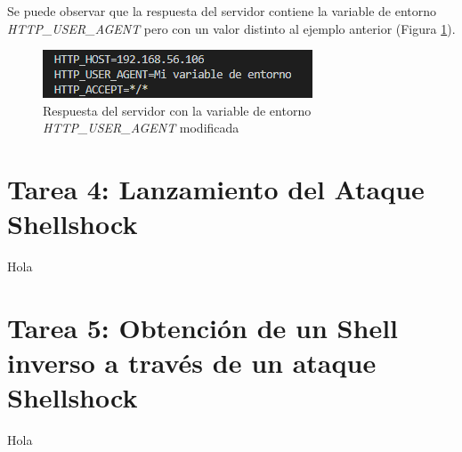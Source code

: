 \documentclass[10pt,a4paper]{article}
\begin{document}
Se puede observar que la respuesta del servidor contiene la variable de entorno \emph{HTTP\_{}USER\_{}AGENT} pero con un valor distinto al ejemplo anterior (Figura \ref{fig:tarea3_modificado}).


\begin{figure}[h!]
\centering
\includegraphics[scale=0.9]{images/Tarea_3_modificada.png}
\caption{Respuesta del servidor con la variable de entorno \emph{HTTP\_{}USER\_{}AGENT} modificada}
\label{fig:tarea3_modificado} 
\end{figure}

\section{Tarea 4: Lanzamiento del Ataque Shellshock}

Hola

\section{Tarea 5: Obtención de un Shell inverso a través de un ataque Shellshock}

Hola
\end{document}
